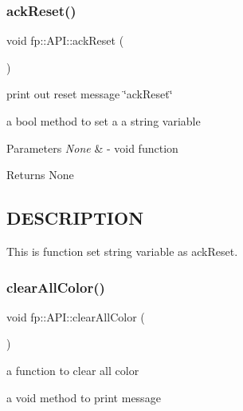 \subsubsection{\texorpdfstring{ack\+Reset()}{ackReset()}}
{\footnotesize\ttfamily void fp\+::\+A\+P\+I\+::ack\+Reset (\begin{DoxyParamCaption}{ }\end{DoxyParamCaption})\hspace{0.3cm}{\ttfamily [static]}}



print out reset message \char`\"{}ack\+Reset\char`\"{} 

a bool method to set a a string variable


\begin{DoxyParams}{Parameters}
{\em None} & -\/ void function \\
\hline
\end{DoxyParams}
\begin{DoxyReturn}{Returns}
None 
\end{DoxyReturn}
\hypertarget{_m_a_z_e_8h_DESCRIPTION}{}\subsection{D\+E\+S\+C\+R\+I\+P\+T\+I\+ON}\label{_m_a_z_e_8h_DESCRIPTION}
This is function set string variable as ack\+Reset. \mbox{\label{classfp_1_1_a_p_i_a68f86debe50e6e2ae0c1fde795a1cfb6}} 
\subsubsection{\texorpdfstring{clear\+All\+Color()}{clearAllColor()}}
{\footnotesize\ttfamily void fp\+::\+A\+P\+I\+::clear\+All\+Color (\begin{DoxyParamCaption}{ }\end{DoxyParamCaption})\hspace{0.3cm}{\ttfamily [static]}}



a function to clear all color 

a void method to print message


